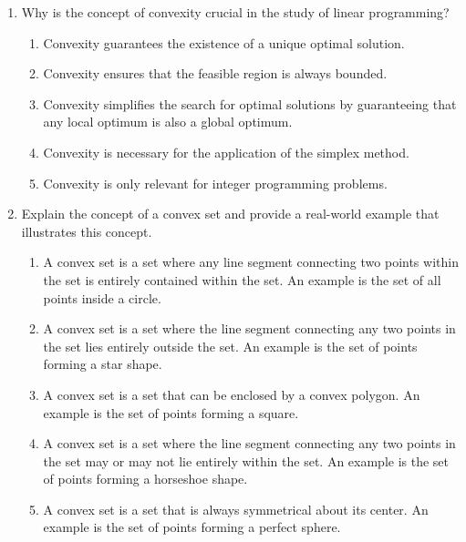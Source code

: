 \documentclass{article}%
\begin{document}
\begin{enumerate}
\begin{enumerate}
\item Closure under vector addition%
\item Closure under intersection%
\item The existence of extreme points%
\item The property of being bounded%
\end{enumerate}%
\vspace{1em}%
\item Why is the concept of convexity crucial in the study of linear programming?%
\begin{enumerate}%
\item Convexity guarantees the existence of a unique optimal solution.%
\item Convexity ensures that the feasible region is always bounded.%
\item Convexity simplifies the search for optimal solutions by guaranteeing that any local optimum is also a global optimum.%
\item Convexity is necessary for the application of the simplex method.%
\item Convexity is only relevant for integer programming problems.%
\end{enumerate}%
\vspace{1em}%
\item Explain the concept of a convex set and provide a real-world example that illustrates this concept.%
\begin{enumerate}%
\item A convex set is a set where any line segment connecting two points within the set is entirely contained within the set.  An example is the set of all points inside a circle.%
\item A convex set is a set where the line segment connecting any two points in the set lies entirely outside the set. An example is the set of points forming a star shape.%
\item A convex set is a set that can be enclosed by a convex polygon. An example is the set of points forming a square.%
\item A convex set is a set where the line segment connecting any two points in the set may or may not lie entirely within the set. An example is the set of points forming a horseshoe shape.%
\item A convex set is a set that is always symmetrical about its center. An example is the set of points forming a perfect sphere.%
\end{enumerate}%
\vspace{1em}%

\end{enumerate}
\end{document}
